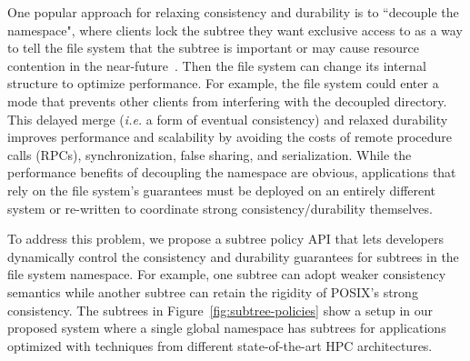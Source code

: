 One popular approach for relaxing consistency and durability is to ``decouple
the namespace", where clients lock the subtree they want exclusive access to as
a way to tell the file system that the subtree is important or may cause
resource contention in the near-future~\cite{grider:pdsw2015-marfs,
zheng:pdsw2015-deltafs, zheng:pdsw2014-batchfs, ren:sc2014-indexfs,
bent:slides-twotiers}. Then the file system can change its internal structure
to optimize performance. For example, the file system could enter a mode that
prevents other clients from interfering with the decoupled directory.  This
delayed merge ({\it i.e.} a form of eventual consistency) and relaxed
durability improves performance and scalability by avoiding the costs of remote procedure calls (RPCs),
synchronization, false sharing, and serialization.  While the performance
benefits of decoupling the namespace are obvious, applications that rely on the
file system's guarantees must be deployed on an entirely different system or
re-written to coordinate strong consistency/durability themselves.

%

To address this problem, we propose a subtree policy API that lets developers dynamically control the
consistency and durability guarantees for subtrees in the file system
namespace. For example, one subtree can adopt weaker consistency semantics
while another subtree can retain the rigidity of POSIX's strong consistency.
The subtrees in Figure~\ref{fig:subtree-policies} show a setup in our proposed system where a single global
namespace has subtrees for applications optimized with techniques from different
state-of-the-art HPC architectures.  

